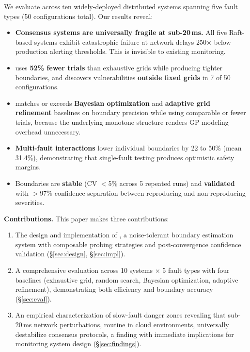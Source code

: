 We evaluate \system{} across ten widely-deployed distributed systems spanning
five fault types (50 configurations total). Our results reveal:

\begin{itemize}[leftmargin=*,topsep=4pt,itemsep=2pt]
  \item \textbf{Consensus systems are universally fragile at sub-20\,ms.}
        All five Raft-based systems exhibit catastrophic failure at network
        delays 250$\times$ below production alerting thresholds. This is
        invisible to existing monitoring.
  \item \system{} uses \textbf{52\% fewer trials} than exhaustive grids while
        producing tighter boundaries, and discovers vulnerabilities
        \textbf{outside fixed grids} in 7 of 50 configurations.
  \item \system{} matches or exceeds \textbf{Bayesian optimization} and
        \textbf{adaptive grid refinement} baselines on boundary precision
        while using comparable or fewer trials, because the underlying
        monotone structure renders GP modeling overhead unnecessary.
  \item \textbf{Multi-fault interactions} lower individual boundaries by
        22 to 50\% (mean 31.4\%), demonstrating that single-fault testing
        produces optimistic safety margins.
  \item Boundaries are \textbf{stable} (CV $<$5\% across 5 repeated runs)
        and \textbf{validated} with $>$97\% confidence separation between
        reproducing and non-reproducing severities.
\end{itemize}

\noindent\textbf{Contributions.} This paper makes three contributions:
\begin{enumerate}[leftmargin=*,topsep=2pt,itemsep=1pt]
  \item The design and implementation of \system{}, a noise-tolerant
        boundary estimation system with composable probing strategies and
        post-convergence confidence validation (\S\ref{sec:design}, \S\ref{sec:impl}).
  \item A comprehensive evaluation across 10 systems $\times$ 5 fault types
        with four baselines (exhaustive grid, random search, Bayesian
        optimization, adaptive refinement), demonstrating both efficiency
        and boundary accuracy (\S\ref{sec:eval}).
  \item An empirical characterization of slow-fault danger zones revealing
        that sub-20\,ms network perturbations, routine in cloud
        environments, universally destabilize consensus protocols, a finding
        with immediate implications for monitoring system design (\S\ref{sec:findings}).
\end{enumerate}
